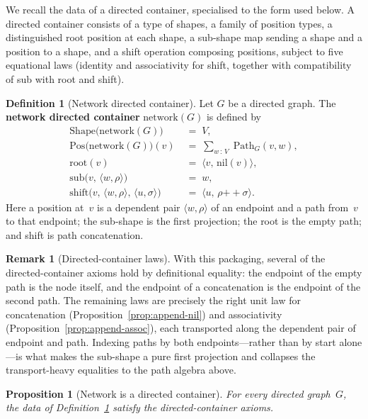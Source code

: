 \documentclass[11pt,a4paper]{article}
\theoremstyle{plain}
\newtheorem{proposition}[theorem]{Proposition}
\theoremstyle{definition}
\newtheorem{definition}[theorem]{Definition}
\newtheorem{remark}[theorem]{Remark}
\newcommand{\Shape}{\mathrm{Shape}}
\newcommand{\Pos}{\mathrm{Pos}}
\newcommand{\rootpos}{\mathrm{root}}
\newcommand{\sub}{\mathrm{sub}}
\newcommand{\shift}{\mathrm{shift}}
\begin{document}
We recall the data of a directed container, specialised to the form used below.
A directed container consists of a type of shapes, a family of position types,
a distinguished root position at each shape, a sub-shape map sending a shape
and a position to a shape, and a shift operation composing positions, subject
to five equational laws (identity and associativity for shift, together with
compatibility of sub with root and shift).

\begin{definition}[Network directed container]\label{def:network}
Let $G$ be a directed graph. The \textbf{network directed container}
$\mathrm{network}(G)$ is defined by
\begin{align}
  \Shape\bigl(\mathrm{network}(G)\bigr)
  &\;=\; V, \\[4pt]
  \Pos\bigl(\mathrm{network}(G)\bigr)(v)
  &\;=\;
  \sum_{w \,:\, V}\; \mathrm{Path}_G(v,w), \\[4pt]
  \rootpos(v)
  &\;=\;
  \bigl\langle v,\, \mathrm{nil}(v) \bigr\rangle, \\[4pt]
  \sub\bigl(v,\, \langle w,\rho \rangle\bigr)
  &\;=\;
  w, \\[4pt]
  \shift\bigl(v,\, \langle w,\rho \rangle,\, \langle u,\sigma \rangle\bigr)
  &\;=\;
  \bigl\langle u,\, \rho \mathbin{{+}{+}} \sigma \bigr\rangle.
\end{align}
Here a position at~$v$ is a dependent pair $\langle w,\rho \rangle$ of an
endpoint and a path from~$v$ to that endpoint; the sub-shape is the first
projection; the root is the empty path; and shift is path concatenation.
\end{definition}

\begin{remark}[Directed-container laws]
With this packaging, several of the directed-container axioms hold by
definitional equality: the endpoint of the empty path is the node itself, and
the endpoint of a concatenation is the endpoint of the second path. The
remaining laws are precisely the right unit law for concatenation
(Proposition~\ref{prop:append-nil}) and associativity
(Proposition~\ref{prop:append-assoc}), each transported along the dependent
pair of endpoint and path. Indexing paths by both endpoints---rather than by
start alone---is what makes the sub-shape a pure first projection and collapses
the transport-heavy equalities to the path algebra above.
\end{remark}

\begin{proposition}[Network is a directed container]\label{prop:network-dc}
For every directed graph~$G$, the data of Definition~\ref{def:network}
satisfy the directed-container axioms.
\end{proposition}
\end{document}
